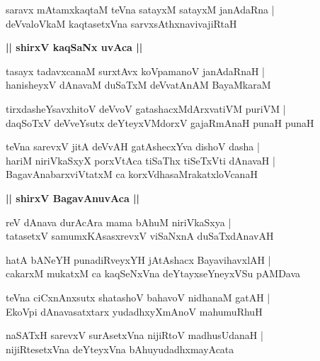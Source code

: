 \documentclass[twoside,12pt,openright]{book}
\newcounter{shloka}[chapter]
\def\uvaca#1{\centerline{{\large\textbf{#1}}}}
\begin{document}
\begin{shloka}%
saravx mAtamxkaqtaM teVna satayxM satayxM janAdaRna |\\
deVvaloVkaM kaqtasetxVna sarvxsAthxnavivajiRtaH
\end{shloka}

\uvaca{|| shirxV kaqSaNx uvAca ||}

\begin{shloka}%
tasayx tadavxcanaM surxtAvx koVpamanoV janAdaRnaH |\\
hanisheyxV dAnavaM duSaTxM deVvatAnAM BayaMkaraM
\end{shloka}

\begin{shloka}%
tirxdasheYsavxhitoV deVvoV gatashacxMdArxvatiVM puriVM |\\
daqSoTxV deVveYsutx deYteyxVMdorxV gajaRmAnaH punaH punaH
\end{shloka}

\begin{shloka}%
teVna sarevxV jitA deVvAH gatAshecxYva dishoV dasha |\\
hariM niriVkaSxyX porxVtAca tiSaThx tiSeTxVti dAnavaH |\\
BagavAnabarxviVtatxM ca korxVdhasaMrakatxloVcanaH
\end{shloka}

\uvaca{|| shirxV BagavAnuvAca ||}

\begin{shloka}%
reV dAnava durAcAra mama bAhuM niriVkaSxya |\\
tatasetxV samumxKAsasxrevxV viSaNxnA duSaTxdAnavAH 
\end{shloka}

\begin{shloka}%
hatA bANeYH punadiRveyxYH jAtAshacx BayavihavxlAH |\\
cakarxM mukatxM ca kaqSeNxVna deYtayxseYneyxVSu pAMDava
\end{shloka}

\begin{shloka}%
teVna ciCxnAnxsutx shatashoV bahavoV nidhanaM gatAH |\\
EkoVpi dAnavasatxtarx yudadhxyXmAnoV mahumuRhuH 
\end{shloka}

\begin{shloka}%
naSATxH sarevxV surAsetxVna nijiRtoV madhusUdanaH |\\
nijiRtesetxVna deYteyxVna bAhuyudadhxmayAcata
\end{shloka}
\end{document}

